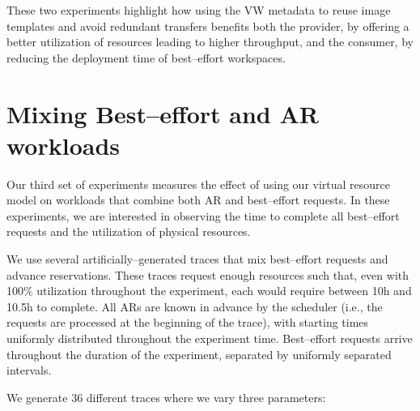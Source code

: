 These two experiments highlight how using the VW metadata to reuse image
templates and avoid redundant transfers benefits both the provider, by
offering a better utilization of resources leading to higher
throughput, and the consumer, by reducing the deployment time of best--effort
workspaces.


\section{Mixing Best--effort and AR workloads}

Our third set of experiments measures the effect of using our virtual resource model on workloads that combine both AR and best--effort requests. In these experiments, we are interested in observing the time to complete all best--effort requests and the utilization of physical resources.

We use several artificially--generated traces that mix best--effort requests and advance reservations. These traces request enough resources such that, even with 100\% utilization throughout the experiment, each would require between 10h and 10.5h to complete. All ARs are known in advance by the scheduler (i.e., the requests are processed at the beginning of the trace), with starting times uniformly distributed throughout the experiment time. Best--effort requests arrive throughout the duration of the experiment, separated by uniformly separated intervals. 

We generate 36 different traces where we vary three parameters:

